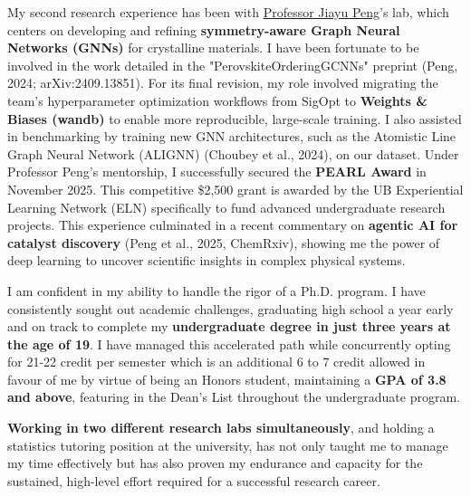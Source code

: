 \documentclass[12pt, letterpaper]{article}
\begin{document}
My second research experience has been with \href{https://ubwp.buffalo.edu/jiayu-peng-lab/jiayu/}{Professor Jiayu Peng}’s lab, which centers on developing and refining \textbf{symmetry-aware Graph Neural Networks (GNNs)} for crystalline materials. I have been fortunate to be involved in the work detailed in the "PerovskiteOrderingGCNNs" preprint (Peng, 2024; arXiv:2409.13851). For its final revision, my role involved migrating the team’s hyperparameter optimization workflows from SigOpt to \textbf{Weights \& Biases (wandb)} to enable more reproducible, large-scale training. I also assisted in benchmarking by training new GNN architectures, such as the Atomistic Line Graph Neural Network (ALIGNN) (Choubey et al., 2024), on our dataset. Under Professor Peng's mentorship, I successfully secured the \textbf{PEARL Award} in November 2025. This competitive \$2,500 grant is awarded by the UB Experiential Learning Network (ELN) specifically to fund advanced undergraduate research projects. This experience culminated in a recent commentary on \textbf{agentic AI for catalyst discovery} (Peng et al., 2025, ChemRxiv), showing me the power of deep learning to uncover scientific insights in complex physical systems.

I am confident in my ability to handle the rigor of a Ph.D. program. I have consistently sought out academic challenges, graduating high school a year early and on track to complete my \textbf{undergraduate degree in just three years at the age of 19}. I have managed this accelerated path while concurrently opting for 21-22 credit per semester which is an additional 6 to 7 credit allowed in favour of me by virtue of being an Honors student, maintaining a \textbf{GPA of 3.8 and above}, featuring in the Dean's List throughout the undergraduate program.

\textbf{Working in two different research labs simultaneously}, and holding a statistics tutoring position at the university, has not only taught me to manage my time effectively but has also proven my endurance and capacity for the sustained, high-level effort required for a successful research career.

\end{document}
